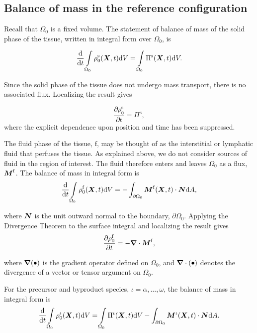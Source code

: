 \subsection{Balance of mass in the reference configuration}
\label{sect2.1} Recall that $\Omega_0$ is a fixed volume. The
statement of balance of mass of the solid phase of the tissue,
written in integral form over $\Omega_0$, is

\begin{equation}
\frac{\mathrm{d}}{\mathrm{d}t} \int\limits_{\Omega_0}
\rho_0^\mathrm{s} (\mbox{\boldmath$ X$},t)\mathrm{d}V = \int\limits_{\Omega_0}
\Pi^\mathrm{s} (\mbox{\boldmath$ X$},t)\mathrm{d}V. \label{massbalintA}
\end{equation}

\noindent Since the solid phase of the tissue does not undergo
mass transport, there is no associated flux. Localizing the result
gives

\begin{equation}
\frac{\partial\rho_0^\mathrm{s}}{\partial t} = \Pi^\mathrm{s},
\label{massballocA}
\end{equation}
\noindent where the explicit dependence upon position and time has
been suppressed.

The fluid phase of the tissue, $\mathrm{f}$, may be thought of as
the interstitial or lymphatic fluid that perfuses the tissue. As
explained above, we do not consider sources of fluid in the region
of interest. The fluid therefore enters and leaves $\Omega_0$ as a
flux, $\mbox{\boldmath$ M$}^\mathrm{f}$. The balance of mass in integral form is
\begin{equation}
\frac{\mathrm{d}}{\mathrm{d}t} \int\limits_{\Omega_0}
\rho_0^\mathrm{f} (\mbox{\boldmath$ X$},t)\mathrm{d}V =
-\int_{\partial\Omega_0}\mbox{\boldmath$ M$}^\mathrm{f}(\mbox{\boldmath$ X$},t)\cdot\mbox{\boldmath$ N$} \mathrm{d}A,
\label{massbalintB}
\end{equation}

\noindent where $\mbox{\boldmath$ N$}$ is the unit outward normal to the boundary,
$\partial\Omega_0$. Applying the Divergence Theorem to the surface
integral and localizing the result gives
\begin{equation}
\frac{\partial\rho_0^\mathrm{f}}{\partial t} = -
\mbox{\boldmath$\nabla$}\cdot\mbox{\boldmath$ M$}^\mathrm{f}, \label{massballocB}
\end{equation}

\noindent where $\mbox{\boldmath$\nabla$}(\bullet)$ is the gradient operator
defined on $\Omega_0$, and $\mbox{\boldmath$\nabla$}\cdot(\bullet)$ denotes the
divergence of a vector or tensor argument on $\Omega_0$.

For the precursor and byproduct species,
$\iota=\alpha,\dots,\omega$, the balance of mass in integral form
is
\begin{equation}
\frac{\mathrm{d}}{\mathrm{d}t} \int\limits_{\Omega_0} \rho_0^\iota
(\mbox{\boldmath$ X$},t)\mathrm{d}V = \int\limits_{\Omega_0} \Pi^\iota
(\mbox{\boldmath$ X$},t)\mathrm{d}V
-\int_{\partial\Omega_0}\mbox{\boldmath$ M$}^\iota(\mbox{\boldmath$ X$},t)\cdot\mbox{\boldmath$ N$} \mathrm{d}A.
\label{massbalintI}
\end{equation}

